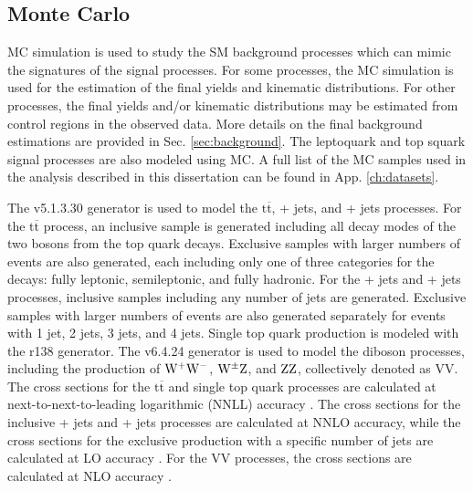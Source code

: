 \documentclass[12pt]{thesis}  %
\renewcommand{\ttbar}{\ensuremath{\mathrm{t}\overline{\mathrm{t}}}\xspace}
\begin{document}
\subsection{Monte Carlo}

MC simulation is used to study the SM background processes which can mimic the signatures of the signal processes. For some processes, the MC simulation is used for the estimation of the final yields and kinematic distributions. For other processes, the final yields and/or kinematic distributions may be estimated from control regions in the observed data. More details on the final background estimations are provided in Sec. \ref{sec:background}. The leptoquark and top squark signal processes are also modeled using MC. A full list of the MC samples used in the analysis described in this dissertation can be found in App. \ref{ch:datasets}.

The \MADGRAPH v5.1.3.30 generator \cite{MadGraph} is used to model the \ttbar, \W + jets, and \Z + jets processes. For the \ttbar process, an inclusive sample is generated including all decay modes of the two \W bosons from the top quark decays. Exclusive samples with larger numbers of events are also generated, each including only one of three categories for the \W decays: fully leptonic, semileptonic, and fully hadronic. For the \W + jets and \Z + jets processes, inclusive samples including any number of jets are generated. Exclusive samples with larger numbers of events are also generated separately for events with 1 jet, 2 jets, 3 jets, and 4 jets. Single top quark production is modeled with the  r138 \cite{POWHEG2,POWHEG:singlet,POWHEG:singletW} generator. The \PYTHIA v6.4.24 generator \cite{Sjostrand:2006za} is used to model the diboson processes, including the production of $\mathrm{W}^{+}\mathrm{W}^{-}$, $\mathrm{W}^{\pm}\mathrm{Z}$, and $\mathrm{Z}\mathrm{Z}$, collectively denoted as VV. The cross sections for the \ttbar and single top quark processes are calculated at next-to-next-to-leading logarithmic (NNLL) accuracy \cite{TOPCrossSec}. The cross sections for the inclusive \W + jets and \Z + jets processes are calculated at NNLO accuracy, while the cross sections for the exclusive production with a specific number of jets are calculated at LO accuracy \cite{FEWZ}. For the VV processes, the cross sections are calculated at NLO accuracy \cite{MCFM}.
\end{document}
